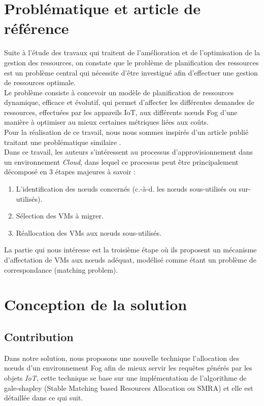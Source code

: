 \section{Problématique et article de référence}
Suite à l'étude des travaux qui traitent de l'amélioration et de l'optimisation de la gestion des ressources, on constate que le problème de planification des ressources est un problème central qui nécessite d'être investigué afin d'effectuer une gestion de ressources optimale. \\
Le problème consiste à concevoir un modèle de planification de ressources dynamique, efficace et évolutif, qui permet d'affecter les différentes demandes de ressources, effectuées par les appareils IoT, aux différents nœuds Fog d'une manière à optimiser au mieux certaines métriques liées aux coûts.\\
Pour la réalisation de ce travail, nous nous sommes inspirés d'un article publié traitant une problématique similaire \cite{jing2016}. \\
Dans ce travail, les auteurs s'intéressent au processus d'approvisionnement dans un environnement \emph{Cloud}, dans lequel ce processus peut être principalement décomposé en 3 étapes majeures à savoir : 
\begin{enumerate}
    \item L'identification des nœuds concernés (c.-à-d. les nœuds sous-utilisés ou sur-utilisés). 
    \item Sélection des VMs à migrer.
    \item Réallocation des VMs aux nœuds sous-utilisés.
\end{enumerate}
La partie qui nous intéresse est la troisième étape où ils proposent un mécanisme d'affectation de VMs aux nœuds adéquat, modélisé comme étant un problème de correspondance (matching problem).

\section{Conception de la solution}
\subsection{Contribution}
Dans notre solution, nous proposons une nouvelle technique l'allocation des nœuds d'un environnement Fog afin de mieux servir les requêtes générés par les objets \emph{IoT}, cette technique se base sur une implémentation de l'algorithme de gale-shapley \cite{gale-shapley} (Stable Matching based Resources Allocation ou SMRA) et elle est détaillée dans ce qui suit.\par

